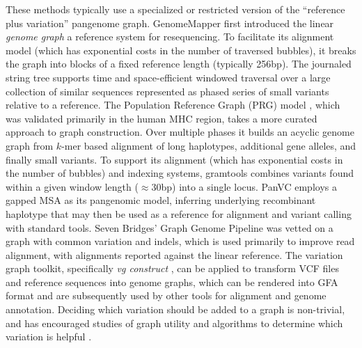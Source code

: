 These methods typically use a specialized or restricted version of the ``reference plus variation'' pangenome graph.
GenomeMapper \cite{Schneeberger_2009} first introduced the linear \emph{genome graph} a reference system for resequencing.
To facilitate its alignment model (which has exponential costs in the number of traversed bubbles), it breaks the graph into blocks of a fixed reference length (typically 256bp).
The journaled string tree \cite{Rahn_2014} supports time and space-efficient windowed traversal over a large collection of similar sequences represented as phased series of small variants relative to a reference.
The Population Reference Graph (PRG) model \cite{dilthey2015improved}, which was validated primarily in the human MHC region, takes a more curated approach to graph construction.
Over multiple phases it builds an acyclic genome graph from $k$-mer based alignment of long haplotypes, additional gene alleles, and finally small variants.
To support its alignment (which has exponential costs in the number of bubbles) and indexing systems, gramtools \cite{Maciuca_2016} combines variants found within a given window length ($\approx$30bp) into a single locus.
PanVC \cite{Valenzuela_2018} employs a gapped MSA as its pangenomic model, inferring underlying recombinant haplotype that may then be used as a reference for alignment and variant calling with standard tools.
Seven Bridges' Graph Genome Pipeline \cite{Rakocevic_2019} was vetted on a graph with common variation and indels, which is used primarily to improve read alignment, with alignments reported against the linear reference.
The variation graph toolkit, specifically \textit{vg construct} \cite{Garrison_2018}, can be applied to transform VCF files and reference sequences into genome graphs, which can be rendered into GFA format and are subsequently used by other tools for alignment and genome annotation.
Deciding which variation should be added to a graph is non-trivial, and has encouraged studies of graph utility \cite{Novak_2017a} and algorithms to determine which variation is helpful \cite{Pritt_2018}.


